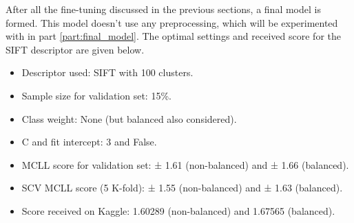 After all the fine-tuning discussed in the previous sections, a final model is formed.
This model doesn't use any preprocessing, which will be experimented with in part \ref{part:final_model}.
The optimal settings and received score for the SIFT descriptor are given below.
\begin{itemize}
    \item Descriptor used: SIFT with 100 clusters.
    \item Sample size for validation set: 15\%.
    \item Class weight: None (but balanced also considered).
    \item C and fit intercept: 3 and False.
    \item MCLL score for validation set: ± 1.61 (non-balanced) and ± 1.66 (balanced).
    \item SCV MCLL score (5 K-fold): ± 1.55 (non-balanced) and ± 1.63 (balanced).
    \item Score received on Kaggle: 1.60289 (non-balanced) and 1.67565 (balanced).
\end{itemize}